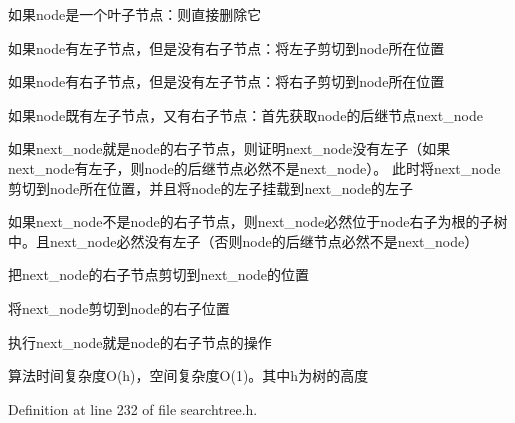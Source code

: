\begin{DoxyItemize}
\item 如果{\ttfamily node}是一个叶子节点：则直接删除它
\item 如果{\ttfamily node}有左子节点，但是没有右子节点：将左子剪切到{\ttfamily node}所在位置
\item 如果{\ttfamily node}有右子节点，但是没有左子节点：将右子剪切到{\ttfamily node}所在位置
\item 如果{\ttfamily node}既有左子节点，又有右子节点：首先获取{\ttfamily node}的后继节点{\ttfamily next\+\_\+node}
\begin{DoxyItemize}
\item 如果{\ttfamily next\+\_\+node}就是{\ttfamily node}的右子节点，则证明{\ttfamily next\+\_\+node}没有左子（如果{\ttfamily next\+\_\+node}有左子，则{\ttfamily node}的后继节点必然不是{\ttfamily next\+\_\+node}）。 此时将{\ttfamily next\+\_\+node}剪切到{\ttfamily node}所在位置，并且将{\ttfamily node}的左子挂载到{\ttfamily next\+\_\+node}的左子
\item 如果{\ttfamily next\+\_\+node}不是{\ttfamily node}的右子节点，则{\ttfamily next\+\_\+node}必然位于{\ttfamily node}右子为根的子树中。且{\ttfamily next\+\_\+node}必然没有左子（否则{\ttfamily node}的后继节点必然不是{\ttfamily next\+\_\+node}）
\begin{DoxyItemize}
\item 把{\ttfamily next\+\_\+node}的右子节点剪切到{\ttfamily next\+\_\+node}的位置
\item 将{\ttfamily next\+\_\+node}剪切到{\ttfamily node}的右子位置
\item 执行{\ttfamily next\+\_\+node}就是{\ttfamily node}的右子节点的操作
\end{DoxyItemize}
\end{DoxyItemize}
\end{DoxyItemize}

算法时间复杂度\+O(h)，空间复杂度\+O(1)。其中h为树的高度 

Definition at line 232 of file searchtree.\+h.

\hypertarget{class_introdunction_to_algorithm_1_1_tree_algorithm_1_1_search_tree_a55d663befd7f7ef9d2238963666c69ff}{}
